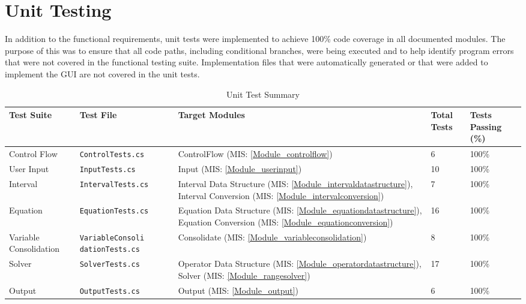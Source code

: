 \documentclass[12pt, titlepage]{article}
\newcommand{\misref}[1]{MIS: \ref{#1}}
\begin{document}
\section{Unit Testing}
In addition to the functional requirements, unit tests were implemented to 
achieve 100\% code coverage in all documented modules. The purpose of this was 
to ensure that all code paths, including conditional branches, were being 
executed and to help identify program errors that were not covered in the 
functional testing suite. Implementation files that were automatically 
generated or that were added to implement the GUI are not covered in the unit 
tests.

\begin{center}
		\begin{longtable}{ | p{2.5cm} | p{4cm} | p{2.5cm} | m{1cm} | m{1.5cm} 
		|}
		\caption{Unit Test Summary} \\ \hline \label{TblUnitTests} 
		\textbf{Test Suite} & \textbf{Test File} & \textbf{Target Modules} & 
		\textbf{Total Tests} & 
		\textbf{Tests Passing (\%)}  \\ 
		\hline
		Control Flow & \texttt{ControlTests.cs} & ControlFlow 
		(\misref{Module_controlflow}) & 6 & 100\% \\ 
		\hline
		
		User Input & \texttt{InputTests.cs} &Input (\misref{Module_userinput}) 
		& 10 & 100\% \\ \hline
		
		Interval & \texttt{IntervalTests.cs} &Interval Data Structure 
		(\misref{Module_intervaldatastructure}), Interval Conversion 
		(\misref{Module_intervalconversion}) & 7 & 100\% \\ \hline
		
		Equation & \texttt{EquationTests.cs} &Equation Data Structure 
		(\misref{Module_equationdatastructure}), Equation Conversion 
		(\misref{Module_equationconversion}) & 16 & 100\% \\ \hline
		
		Variable Consolidation & \texttt{VariableConsoli dationTests.cs} & 
		Consolidate 
		(\misref{Module_variableconsolidation}) & 8 & 100\% \\ \hline
		
		Solver &\texttt{SolverTests.cs} & Operator Data Structure 
		(\misref{Module_operatordatastructure}), Solver 
		(\misref{Module_rangesolver}) & 17 & 100\% \\ \hline
		
		Output & \texttt{OutputTests.cs} &Output (\misref{Module_output}) & 6 & 
		100\% \\ \hline
	\end{longtable}
\end{center}
\end{document}
